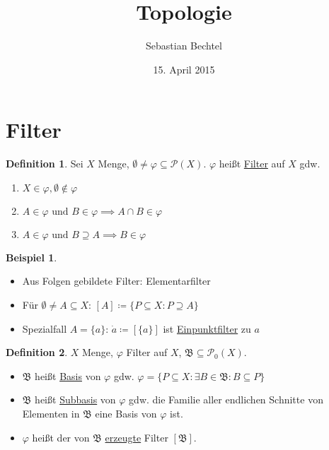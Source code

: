 \documentclass[12pt]{scrartcl}%
\theoremstyle{definition}
\newtheorem*{defn}{Definition}
\newtheorem{ex}{Beispiel}
\theoremstyle{remark}
\newcommand{\powerset}{\mathcal{P}}
\begin{document}
\author{Sebastian Bechtel}
\title{Topologie}
\date{15. April 2015}

\maketitle %

\section*{Filter}

\begin{defn}
    Sei $X$ Menge, $\emptyset\neq \varphi\subseteq \powerset(X)$. $\varphi$ heißt \underline{Filter} auf $X$ gdw.

    \begin{enumerate}[label=(\arabic*)]
        \item $X\in \varphi, \emptyset\not\in\varphi$
        \item $A\in\varphi \text{ und } B\in\varphi \implies A\cap B\in\varphi$
        \item $A\in\varphi \text{ und } B\supseteq A \implies B\in\varphi$
    \end{enumerate}
\end{defn}

\begin{ex}
    \begin{itemize}
        \item Aus Folgen gebildete Filter: Elementarfilter
        \item Für $\emptyset \neq A\subseteq X$: $[A]\coloneqq \{P\subseteq X: P \supseteq A\}$
        \item Spezialfall $A=\{a\}$: $\dot a\coloneqq [\{a\}]$ ist \underline{Einpunktfilter} zu $a$
    \end{itemize}
\end{ex}

\begin{defn}
    $X$ Menge, $\varphi$ Filter auf $X$, $\mathfrak{B}\subseteq \powerset_0(X)$.

    \begin{itemize}
        \item $\mathfrak{B}$ heißt \underline{Basis} von $\varphi$ gdw. $\varphi = \{P\subseteq X: \exists B\in\mathfrak{B}: B\subseteq P\}$
        \item $\mathfrak{B}$ heißt \underline{Subbasis} von $\varphi$ gdw. die Familie aller endlichen Schnitte von Elementen in $\mathfrak{B}$ eine Basis von $\varphi$ ist.
        \item $\varphi$ heißt der von $\mathfrak{B}$ \underline{erzeugte} Filter $[\mathfrak{B}]$.
    \end{itemize}
\end{defn}
\end{document}
